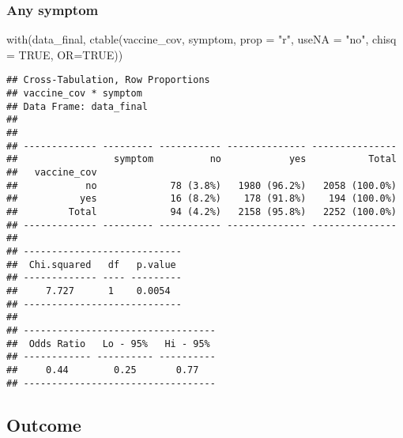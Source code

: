 \documentclass[
]{article}
\newenvironment{Shaded}{\begin{snugshade}}{\end{snugshade}}
\newcommand{\AttributeTok}[1]{\textcolor[rgb]{0.77,0.63,0.00}{#1}}
\newcommand{\ConstantTok}[1]{\textcolor[rgb]{0.00,0.00,0.00}{#1}}
\newcommand{\FunctionTok}[1]{\textcolor[rgb]{0.00,0.00,0.00}{#1}}
\newcommand{\NormalTok}[1]{#1}
\newcommand{\StringTok}[1]{\textcolor[rgb]{0.31,0.60,0.02}{#1}}
\begin{document}
\hypertarget{any-symptom}{%
\subsubsection{Any symptom}\label{any-symptom}}

\begin{Shaded}
\begin{Highlighting}[]
\FunctionTok{with}\NormalTok{(data\_final, }\FunctionTok{ctable}\NormalTok{(vaccine\_cov, symptom, }\AttributeTok{prop =} \StringTok{"r"}\NormalTok{, }\AttributeTok{useNA =} \StringTok{"no"}\NormalTok{, }\AttributeTok{chisq =} \ConstantTok{TRUE}\NormalTok{, }\AttributeTok{OR=}\ConstantTok{TRUE}\NormalTok{))}
\end{Highlighting}
\end{Shaded}

\begin{verbatim}
## Cross-Tabulation, Row Proportions  
## vaccine_cov * symptom  
## Data Frame: data_final  
## 
## 
## ------------- --------- ----------- -------------- ---------------
##                 symptom          no            yes           Total
##   vaccine_cov                                                     
##            no             78 (3.8%)   1980 (96.2%)   2058 (100.0%)
##           yes             16 (8.2%)    178 (91.8%)    194 (100.0%)
##         Total             94 (4.2%)   2158 (95.8%)   2252 (100.0%)
## ------------- --------- ----------- -------------- ---------------
## 
## ----------------------------
##  Chi.squared   df   p.value 
## ------------- ---- ---------
##     7.727      1    0.0054  
## ----------------------------
## 
## ----------------------------------
##  Odds Ratio   Lo - 95%   Hi - 95% 
## ------------ ---------- ----------
##     0.44        0.25       0.77   
## ----------------------------------
\end{verbatim}

\hypertarget{outcome}{%
\subsection{Outcome}\label{outcome}}
\end{document}
